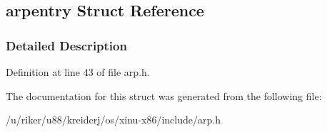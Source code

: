 \hypertarget{structarpentry}{}\subsection{arpentry Struct Reference}
\label{structarpentry}


\subsubsection{Detailed Description}


Definition at line 43 of file arp.\+h.



The documentation for this struct was generated from the following file\+:\begin{DoxyCompactItemize}
\item 
/u/riker/u88/kreiderj/os/xinu-\/x86/include/arp.\+h\end{DoxyCompactItemize}
